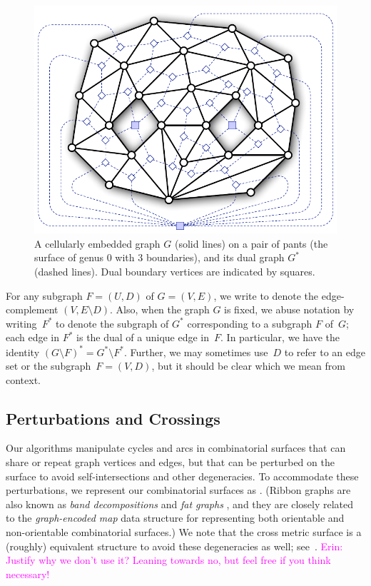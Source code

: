 \documentclass[letterpaper,review]{siamart190516}
\def\enote#1{\textcolor{magenta}{Erin: #1}}
\begin{document}
\begin{figure}[htb]
\centering
\includegraphics[scale=0.45]{Fig/pants}
\caption{A cellularly embedded graph $G$ (solid lines) on a pair of pants (the surface of genus 0 with 3 boundaries), and its dual graph $G^*$ (dashed lines).  Dual boundary vertices are indicated by squares.}
\label{fig:duality}
\end{figure}
 
For any subgraph $F = (U,D)$ of $G = (V,E)$, we write  to denote the edge-complement $(V, {E\setminus D})$.  Also, when the graph $G$ is fixed, we abuse notation by writing~$F^*$ to denote the subgraph of $G^*$ corresponding to a subgraph $F$ of~$G$; each edge in $F^*$ is the dual of a unique edge in~$F$.  In particular, we have the identity $(G\setminus F)^* = G^* \setminus F^*$.
Further, we may sometimes use~$D$ to refer to an edge set or the subgraph~$F = (V, D)$,
but it should be clear which we mean from context.

\subsection{Perturbations and Crossings}
\label{SS:perturb}

Our algorithms manipulate cycles and arcs in combinatorial surfaces that can share or repeat graph vertices and edges, but that can be perturbed on the surface to avoid self-intersections and other degeneracies.  To accommodate these perturbations, we represent our combinatorial surfaces as  \cite{l-gos-2004,em-gos-13}.  (Ribbon graphs are also known as \emph{band decompositions}  \cite{em-gos-13} and \emph{fat graphs} \cite{l-gos-2004}, and they are closely related to the \emph{graph-encoded map} data structure \cite{l-gem-82} for representing both orientable and non-orientable combinatorial surfaces.)  We note that the cross metric surface is a (roughly) equivalent structure to avoid these degeneracies as well; see~\cite{ce-tspcs-06,cl-opdsh-07}. \enote{Justify why we don't use it? Leaning towards no, but feel free if you think necessary!}
\end{document}
